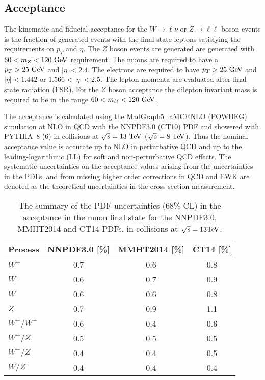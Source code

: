 \subsection{Acceptance}

The kinematic and fiducial acceptance for the $W \rightarrow{\ell\nu}$ or $Z\rightarrow\ell\ell$ boson events is the fraction of generated events with the final state leptons satisfying the requirements on $p_{T}$ and $\eta$. The $Z$ boson events are generated are generated with $60<m_{Z}<120~\mathrm{Ge\kern -0.1em V}$ requirement. The muons are required to have a $p_{T}>25~\mathrm{Ge\kern -0.1em V}$ and $|\eta|<2.4$. The electrons are required to have $p_{T}>25~\mathrm{Ge\kern -0.1em V}$ and $|\eta|<1.442$ or $1.566<|\eta|<2.5$. The lepton momenta are evaluated after final state radiation (FSR). For the $Z$ boson acceptance the dilepton invariant mass is required to be in the range $60<m_{\ell\ell}<120~\mathrm{Ge\kern -0.1em V}$.

The acceptance is calculated using the MadGraph5\_aMC@NLO (POWHEG) simulation at NLO in QCD with the NNPDF3.0 (CT10) PDF and showered with PYTHIA~8 (6) in collisions at $\sqrt{s}=13~\mathrm{Te\kern -0.1em V}$ ($\sqrt{s}=8~\mathrm{Te\kern -0.1em V}$). Thus the nominal acceptance value is accurate up to NLO in perturbative QCD and up to the leading-logarithmic (LL) for soft and non-perturbative QCD effects. The systematic uncertainties on the acceptance values arising from the uncertainties in the PDFs, and from missing higher order corrections in QCD and EWK are denoted as the theoretical uncertainties in the cross section measurement. 
\begin{table}
\begin{center}
\begin{tabular}{|l|c|c|c|}
\hline
Process  &  NNPDF3.0 [\%]  &  MMHT2014 [\%]  &  CT14 [\%] \\
\hline
\hline
$W^+$        & 0.7          &  0.6           &  0.8 \\
$W^-$  & 0.6          &  0.7           &  0.9 \\
$W$            & 0.6          &  0.6           &  0.8 \\
$Z$            & 0.7          &  0.9           &  1.1 \\
$W^+/W^-$                        & 0.6          &  0.4           &  0.6 \\
$W^+/Z$                           & 0.5          &  0.5           &  0.5 \\
$W^-/Z$                           & 0.4          &  0.4           &  0.5 \\
$W/Z$                            & 0.4          &  0.4           &  0.4 \\
\hline
\hline
\end{tabular}
\caption{The summary of the PDF uncertainties ($68\%$ CL) in the acceptance in the muon final state for the NNPDF3.0, MMHT2014 and CT14 PDFs. in collisions at $\sqrt{s}=13\mathrm{Te\kern -0.1em V}$.}
\label{tab:pdf_mu}
\end{center}
\end{table}

